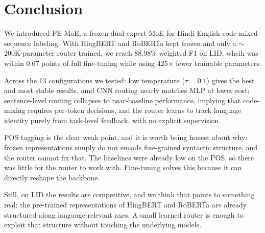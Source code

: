 \documentclass[conference]{IEEEtran}
\begin{document}
\section{Conclusion}

We introduced FE-MoE, a frozen dual-expert MoE for Hindi-English code-mixed sequence labeling. With HingBERT and RoBERTa kept frozen and only a $\sim$200K-parameter router trained, we reach 88.98\% weighted F1 on LID, whcih was within 0.67 points of full fine-tuning while using 425$\times$ fewer trainable parameters.

Across the 13 configurations we tested: low temperature ($\tau{=}0.1$) gives the best and most stable results, amd CNN routing nearly matches MLP at lower cost; sentence-level routing collapses to near-baseline performance, implying that code-mixing requires per-token decisions, and the router learns to track language identity purely from task-level feedback, with no explicit supervision.

POS tagging is the clear weak point, and it is worth being honest about why: frozen representations simply do not encode fine-grained syntactic structure, and the router cannot fix that. The baselines were already low on the POS, so there was little for the router to work with. Fine-tuning solves this because it can directly reshape the backbone.

Still, on LID the results are competitive, and we think that points to something real: the pre-trained representations of HingBERT and RoBERTa are already structured along language-relevant axes. A small learned router is enough to exploit that structure without touching the underlying models.



\end{document}
